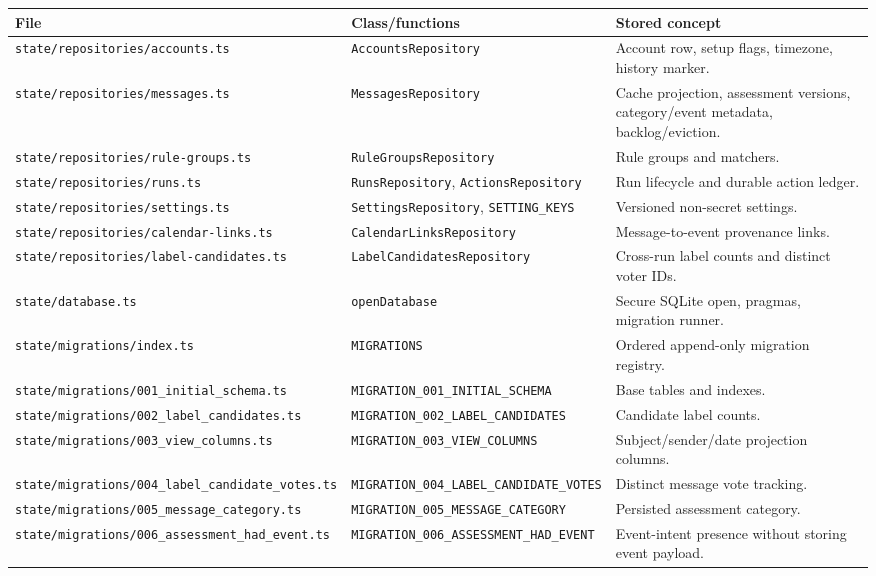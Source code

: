 \documentclass[12pt,oneside]{book}
\newcommand{\code}[1]{\nolinkurl{#1}}
\newcommand{\file}[1]{\nolinkurl{#1}}
\begin{document}
\begingroup\scriptsize
\begin{longtable}{P{4.0cm}P{5.8cm}P{6.6cm}}
\toprule
\textbf{File} & \textbf{Class/functions} & \textbf{Stored concept} \\
\midrule
\endhead
\file{state/repositories/accounts.ts} & \code{AccountsRepository} & Account row, setup flags, timezone, history marker. \\
\file{state/repositories/messages.ts} & \code{MessagesRepository} & Cache projection, assessment versions, category/event metadata, backlog/eviction. \\
\file{state/repositories/rule-groups.ts} & \code{RuleGroupsRepository} & Rule groups and matchers. \\
\file{state/repositories/runs.ts} & \code{RunsRepository}, \code{ActionsRepository} & Run lifecycle and durable action ledger. \\
\file{state/repositories/settings.ts} & \code{SettingsRepository}, \code{SETTING_KEYS} & Versioned non-secret settings. \\
\file{state/repositories/calendar-links.ts} & \code{CalendarLinksRepository} & Message-to-event provenance links. \\
\file{state/repositories/label-candidates.ts} & \code{LabelCandidatesRepository} & Cross-run label counts and distinct voter IDs. \\
\file{state/database.ts} & \code{openDatabase} & Secure SQLite open, pragmas, migration runner. \\
\file{state/migrations/index.ts} & \code{MIGRATIONS} & Ordered append-only migration registry. \\
\file{state/migrations/001_initial_schema.ts} & \code{MIGRATION_001_INITIAL_SCHEMA} & Base tables and indexes. \\
\file{state/migrations/002_label_candidates.ts} & \code{MIGRATION_002_LABEL_CANDIDATES} & Candidate label counts. \\
\file{state/migrations/003_view_columns.ts} & \code{MIGRATION_003_VIEW_COLUMNS} & Subject/sender/date projection columns. \\
\file{state/migrations/004_label_candidate_votes.ts} & \code{MIGRATION_004_LABEL_CANDIDATE_VOTES} & Distinct message vote tracking. \\
\file{state/migrations/005_message_category.ts} & \code{MIGRATION_005_MESSAGE_CATEGORY} & Persisted assessment category. \\
\file{state/migrations/006_assessment_had_event.ts} & \code{MIGRATION_006_ASSESSMENT_HAD_EVENT} & Event-intent presence without storing event payload. \\
\bottomrule
\end{longtable}
\endgroup
\end{document}
